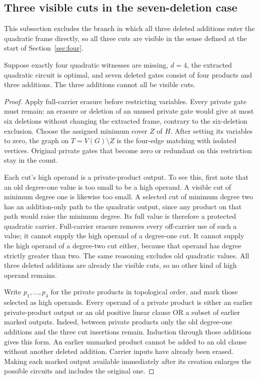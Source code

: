 \subsection{Three visible cuts in the seven-deletion case}
This subsection excludes the branch in which all three deleted additions enter the quadratic frame directly, so all three cuts are visible in the sense defined at the start of Section~\ref{sec:four}.

\begin{proposition}\label{prop:threevisible}
Suppose exactly four quadratic witnesses are missing, $d=4$, the extracted quadratic circuit is optimal, and seven deleted gates consist of four products and three additions. The three additions cannot all be visible cuts.
\end{proposition}
\begin{proof}
Apply full-carrier erasure before restricting variables. Every private gate must remain: an erasure or deletion of an unused private gate would give at most six deletions without changing the extracted frame, contrary to the six-deletion exclusion. Choose the assigned minimum cover $Z$ of $H$. After setting its variables to zero, the graph on $T=V(G)\setminus Z$ is the four-edge matching with isolated vertices. Original private gates that become zero or redundant on this restriction stay in the count.

Each cut's high operand is a private-product output. To see this, first note that an old degree-one value is too small to be a high operand. A visible cut of minimum degree one is likewise too small. A selected cut of minimum degree two has an addition-only path to the quadratic output, since any product on that path would raise the minimum degree. Its full value is therefore a protected quadratic carrier. Full-carrier erasure removes every off-carrier use of such a value; it cannot supply the high operand of a degree-one cut. It cannot supply the high operand of a degree-two cut either, because that operand has degree strictly greater than two. The same reasoning excludes old quadratic values. All three deleted additions are already the visible cuts, so no other kind of high operand remains.

Write $p_1,\ldots,p_4$ for the private products in topological order, and mark those selected as high operands. Every operand of a private product is either an earlier private-product output or an old positive linear clause OR a subset of earlier marked outputs. Indeed, between private products only the old degree-one additions and the three cut insertions remain. Induction through those additions gives this form. An earlier unmarked product cannot be added to an old clause without another deleted addition. Carrier inputs have already been erased. Making each marked output available immediately after its creation enlarges the possible circuits and includes the original one.


\end{proof}
